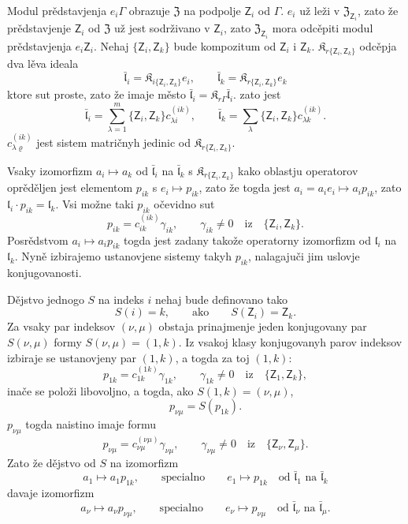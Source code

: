 \documentclass[11pt]{article}
\begin{document}
Modul prědstavjenja \(e_i\Gamma\) obrazuje \(\mathfrak Z\) na podpolje \(\mathsf{Z}_i\) od \(\Gamma\). \(e_i\) už leži v \(\mathfrak Z_{\mathsf{Z}_i}\), zato že prědstavjenje \(\mathsf{Z}_i\) od \(\mathfrak Z\) už jest sodrživano v \(\mathsf{Z}_i\), zato \(\mathfrak Z_{\mathsf{Z}_i}\) mora odcěpiti modul prědstavjenja \(e_i\mathsf{Z}_i\). Nehaj \(\{\mathsf{Z}_i,\mathsf{Z}_k\}\) bude kompozitum od \(\mathsf{Z}_i\) i \(\mathsf{Z}_k\). \(\mathfrak K_{r\{\mathsf{Z}_i,\mathsf{Z}_k\}}\) odcěpja dva lěva ideala
\[
\bar{\mathfrak l}_i=\mathfrak K_{i\{\mathsf{Z}_i,\mathsf{Z}_k\}}e_i,\qquad
\bar{\mathfrak l}_k=\mathfrak K_{r\{\mathsf{Z}_i,\mathsf{Z}_k\}}e_k
\]
ktore sut proste, zato že imaje město \(\bar{\mathfrak l}_i=\mathfrak K_{r\Gamma}\bar{\mathfrak l}_i\). zato jest
\[
\bar{\mathfrak l}_i=\sum_{\lambda=1}^m\{\mathsf{Z}_i,\mathsf{Z}_k\}c_{\lambda i}^{(ik)},\qquad
\bar{\mathfrak l}_k=\sum_{\lambda}\{\mathsf{Z}_i,\mathsf{Z}_k\}c_{\lambda k}^{(ik)}.
\]
\(c_{\lambda\varrho}^{(ik)}\) jest sistem matričnyh jedinic od \(\mathfrak K_{r\{\mathsf{Z}_i,\mathsf{Z}_k\}}\).

Vsaky izomorfizm \(a_i\mapsto a_k\) od \(\bar{\mathfrak l}_i\) na \(\bar{\mathfrak l}_k\) s \(\mathfrak K_{r\{\mathsf{Z}_i,\mathsf{Z}_k\}}\) kako oblastju operatorov oprěděljen jest elementom \(p_{ik}\) s \(e_i\mapsto p_{ik}\), zato že togda jest \(a_i=a_ie_i\mapsto a_ip_{ik}\), zato \(\mathfrak l_i\cdot p_{ik}=\mathfrak l_k\). Vsi možne taki \(p_{ik}\) očevidno sut
\[
p_{ik}=c_{ik}^{(ik)}\gamma_{ik},\qquad \gamma_{ik}\ne0\quad\text{iz}\quad \{\mathsf{Z}_i,\mathsf{Z}_k\}.
\]
Posrědstvom \(a_i\mapsto a_ip_{ik}\) togda jest zadany takože operatorny izomorfizm od \(\mathfrak l_i\) na \(\mathfrak l_k\). Nyně izbirajemo ustanovjene sistemy takyh \(p_{ik}\), nalagajuči jim uslovje konjugovanosti.

Dějstvo jednogo \(S\) na indeks \(i\) nehaj bude definovano tako
\[
S(i)=k,\qquad\text{ako}\qquad S(\mathsf{Z}_i)=\mathsf{Z}_k.
\]
Za vsaky par indeksov \((\nu,\mu)\) obstaja prinajmenje jeden konjugovany par \(S(\nu,\mu)\) formy \(S(\nu,\mu)=(1,k)\). Iz vsakoj klasy konjugovanyh parov indeksov izbiraje se ustanovjeny par \((1,k)\), a togda za toj \((1,k)\):
\[
p_{1k}=c_{1k}^{(1k)}\gamma_{1k},\qquad \gamma_{1k}\ne0\quad\text{iz}\quad \{\mathsf{Z}_1,\mathsf{Z}_k\},
\]
inače se položi libovoljno, a togda, ako \(S(1,k)=(\nu,\mu)\),
\[
p_{\nu\mu}=S(p_{1k}).
\]
\(p_{\nu\mu}\) togda naistino imaje formu
\[
p_{\nu\mu}=c_{\nu\mu}^{(\nu\mu)}\gamma_{\nu\mu},\qquad
\gamma_{\nu\mu}\ne0\quad\text{iz}\quad \{\mathsf{Z}_\nu,\mathsf{Z}_\mu\}.
\]
Zato že dějstvo od \(S\) na izomorfizm
\[
a_1\mapsto a_1p_{1k},\qquad\text{specialno}\qquad e_1\mapsto p_{1k}
\quad\text{od }\bar{\mathfrak l}_1\text{ na }\bar{\mathfrak l}_k
\]
davaje izomorfizm
\[
a_\nu\mapsto a_\nu p_{\nu\mu},\qquad\text{specialno}\qquad e_\nu\mapsto p_{\nu\mu}
\quad\text{od }\bar{\mathfrak l}_\nu\text{ na }\bar{\mathfrak l}_\mu.
\]
\end{document}
